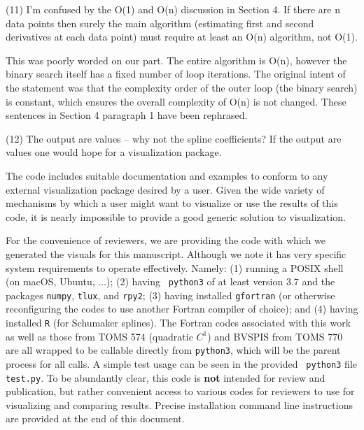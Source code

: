 \goodbreak
{\parindent=20pt \it
  
\item{(11)} I'm confused by the O(1) and O(n) discussion in Section 4.
  If there are n data points then surely the main algorithm
  (estimating first and second derivatives at each data point) must
  require at least an O(n) algorithm, not O(1).

}

This was poorly worded on our part. The entire algorithm is O(n),
however the binary search itself has a fixed number of loop
iterations. The original intent of the statement was that the
complexity order of the outer loop (the binary search) is constant,
which ensures the overall complexity of O(n) is not changed. These
sentences in Section 4 paragraph 1 have been rephrased.


\goodbreak
{\parindent=20pt \it
  
\item{(12)} The output are values -- why not the spline coefficients? If
  the output are values one would hope for a visualization package.

}

The code includes suitable documentation and examples to conform to
any external visualization package desired by a user. Given the wide
variety of mechanisms by which a user might want to visualize or use
the results of this code, it is nearly impossible to provide a good
generic solution to visualization.

For the convenience of reviewers, we are providing the code with which
we generated the visuals for this manuscript. Although we note it has
very specific system requirements to operate effectively. Namely: (1)
running a POSIX shell (on macOS, Ubuntu, $\ldots$); (2) having {\tt
  python3} of at least version $3.7$ and the packages {\tt numpy},
{\tt tlux}, and {\tt rpy2}; (3) having installed {\tt gfortran} (or
otherwise reconfiguring the codes to use another Fortran compiler of
choice); and (4) having installed {\tt R} (for Schumaker splines). The
Fortran codes associated with this work as well as those from TOMS 574
(quadratic $C^1$) and BVSPIS from TOMS 770 are all wrapped to be
callable directly from {\tt python3}, which will be the parent process
for all calls. A simple test usage can be seen in the provided {\tt
  python3} file {\tt test.py}. To be abundantly clear, this code is
{\bf not} intended for review and publication, but rather convenient
access to various codes for reviewers to use for visualizing and
comparing results. Precise installation command line instructions are
provided at the end of this document.


